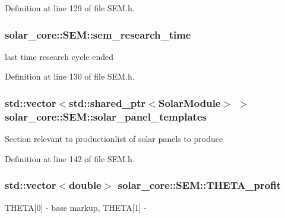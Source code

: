Definition at line 129 of file S\+E\+M.\+h.

\hypertarget{classsolar__core_1_1_s_e_m_a89e5a54de1bb68b94f176e6585a23148}{}
\subsubsection[{sem\+\_\+research\+\_\+time}]{ solar\+\_\+core\+::\+S\+E\+M\+::sem\+\_\+research\+\_\+time\hspace{0.3cm}{\ttfamily [protected]}}\label{classsolar__core_1_1_s_e_m_a89e5a54de1bb68b94f176e6585a23148}
last time research cycle ended 

Definition at line 130 of file S\+E\+M.\+h.

\hypertarget{classsolar__core_1_1_s_e_m_adc6d6784a11bd0243efddbdc0d6e9bb0}{}
\subsubsection[{solar\+\_\+panel\+\_\+templates}]{\setlength{\rightskip}{0pt plus 5cm}std\+::vector$<$std\+::shared\+\_\+ptr$<${\bf Solar\+Module}$>$ $>$ solar\+\_\+core\+::\+S\+E\+M\+::solar\+\_\+panel\+\_\+templates\hspace{0.3cm}{\ttfamily [protected]}}\label{classsolar__core_1_1_s_e_m_adc6d6784a11bd0243efddbdc0d6e9bb0}
Section relevant to productionlist of solar panels to produce 

Definition at line 142 of file S\+E\+M.\+h.

\hypertarget{classsolar__core_1_1_s_e_m_a42278e550f44276e0bb6c966f37c0033}{}
\subsubsection[{T\+H\+E\+T\+A\+\_\+profit}]{\setlength{\rightskip}{0pt plus 5cm}std\+::vector$<$double$>$ solar\+\_\+core\+::\+S\+E\+M\+::\+T\+H\+E\+T\+A\+\_\+profit\hspace{0.3cm}{\ttfamily [protected]}}\label{classsolar__core_1_1_s_e_m_a42278e550f44276e0bb6c966f37c0033}
T\+H\+E\+T\+A\mbox{[}0\mbox{]} -\/ base markup, T\+H\+E\+T\+A\mbox{[}1\mbox{]} -\/ 

